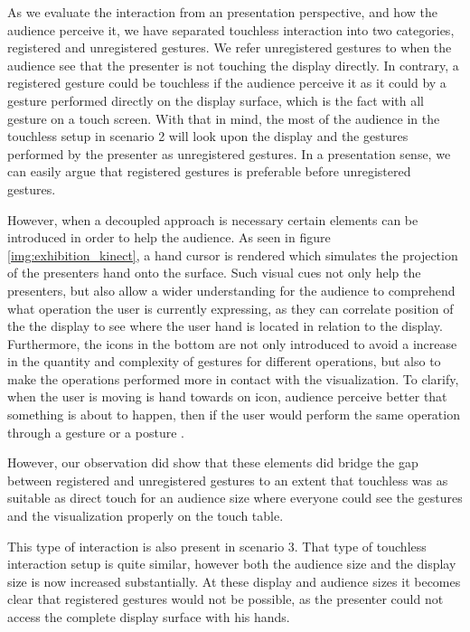 \documentclass[review,journal]{vgtc}         %
\begin{document}
As we evaluate the interaction from an presentation perspective, and how the audience perceive it, we have separated touchless interaction into two categories, registered and unregistered gestures.
We refer unregistered gestures to when the audience see that the presenter is not touching the display directly. 
In contrary, a registered gesture could be touchless if the audience perceive it as it could by a gesture performed directly on the display surface, which is the fact with all gesture on a touch screen.
With that in mind, the most of the audience in the touchless setup in scenario 2 will look upon the display and the gestures performed by the presenter as unregistered gestures.
In a presentation sense, we can easily argue that registered gestures is preferable before unregistered gestures.
 
However, when a decoupled approach is necessary certain elements can be introduced in order to help the audience. As seen in figure \ref{img:exhibition_kinect}, a hand cursor is rendered which simulates the projection of the presenters hand onto the surface. Such visual cues not only help the presenters, but also allow a wider understanding for the audience to comprehend what operation the user is currently expressing, as they can correlate position of the the display to see where the user hand is located in relation to the display.
Furthermore, the icons in the bottom are not only introduced to avoid a increase in the quantity and complexity of gestures for different operations, but also to make the operations performed more in contact with the visualization. To clarify, when the user is moving is hand towards on icon, audience perceive better that something is about to happen, then if the user would perform the same operation through a gesture or a posture \cite{isenberg:hal-00781237}.

However, our observation did show that these elements did bridge the gap between registered and unregistered gestures to an extent that touchless was as suitable as direct touch for an audience size where everyone could see the gestures and the visualization properly on the touch table.

This type of interaction is also present in scenario 3. That type of touchless interaction setup is quite similar, however both the audience size and the display size is now increased substantially. At these display and audience sizes it becomes clear that registered gestures would not be possible, as the presenter could not access the complete display surface with his hands.
\end{document}
